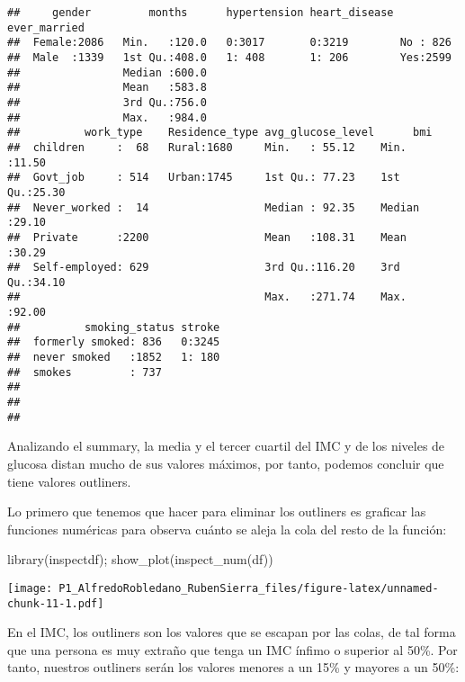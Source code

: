 \documentclass[
]{article}
\newenvironment{Shaded}{\begin{snugshade}}{\end{snugshade}}
\newcommand{\FunctionTok}[1]{\textcolor[rgb]{0.00,0.00,0.00}{#1}}
\newcommand{\NormalTok}[1]{#1}
\begin{document}
\begin{verbatim}
##     gender         months      hypertension heart_disease ever_married
##  Female:2086   Min.   :120.0   0:3017       0:3219        No : 826    
##  Male  :1339   1st Qu.:408.0   1: 408       1: 206        Yes:2599    
##                Median :600.0                                          
##                Mean   :583.8                                          
##                3rd Qu.:756.0                                          
##                Max.   :984.0                                          
##          work_type    Residence_type avg_glucose_level      bmi       
##  children     :  68   Rural:1680     Min.   : 55.12    Min.   :11.50  
##  Govt_job     : 514   Urban:1745     1st Qu.: 77.23    1st Qu.:25.30  
##  Never_worked :  14                  Median : 92.35    Median :29.10  
##  Private      :2200                  Mean   :108.31    Mean   :30.29  
##  Self-employed: 629                  3rd Qu.:116.20    3rd Qu.:34.10  
##                                      Max.   :271.74    Max.   :92.00  
##          smoking_status stroke  
##  formerly smoked: 836   0:3245  
##  never smoked   :1852   1: 180  
##  smokes         : 737           
##                                 
##                                 
## 
\end{verbatim}

Analizando el summary, la media y el tercer cuartil del IMC y de los
niveles de glucosa distan mucho de sus valores máximos, por tanto,
podemos concluir que tiene valores outliners.

Lo primero que tenemos que hacer para eliminar los outliners es graficar
las funciones numéricas para observa cuánto se aleja la cola del resto
de la función:

\begin{Shaded}
\begin{Highlighting}[]
\FunctionTok{library}\NormalTok{(inspectdf);}
\FunctionTok{show\_plot}\NormalTok{(}\FunctionTok{inspect\_num}\NormalTok{(df))}
\end{Highlighting}
\end{Shaded}

\texttt{[image: P1\_AlfredoRobledano\_RubenSierra\_files/figure-latex/unnamed-chunk-11-1.pdf]}

En el IMC, los outliners son los valores que se escapan por las colas,
de tal forma que una persona es muy extraño que tenga un IMC ínfimo o
superior al 50\%. Por tanto, nuestros outliners serán los valores
menores a un 15\% y mayores a un 50\%:
\end{document}
